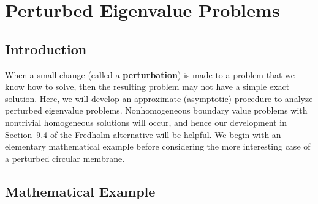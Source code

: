 \section{Perturbed Eigenvalue Problems}
\label{sec:perturbed-eig}

\subsection{Introduction}
\label{sec:perturbed-intro}

When a small change (called a \textbf{perturbation}) is made to a problem that we know how to solve, then the resulting problem may not have a simple exact solution.  Here, we will develop an approximate (asymptotic) procedure to analyze perturbed eigenvalue problems.  Nonhomogeneous boundary value problems with nontrivial homogeneous solutions will occur, and hence our development in Section~9.4 of the Fredholm alternative will be helpful.  We begin with an elementary mathematical example before considering the more interesting case of a perturbed circular membrane.

\subsection{Mathematical Example}
\label{sec:perturbed-math}

